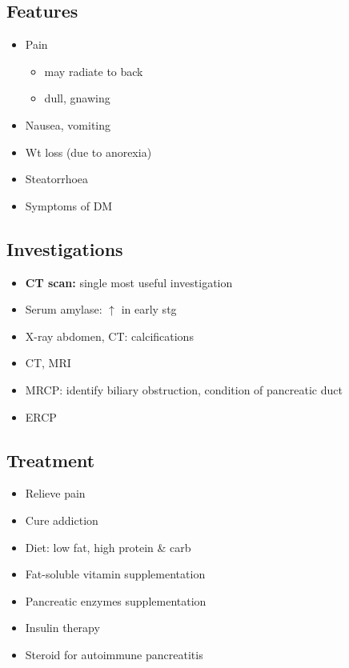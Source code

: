 \documentclass[
  12pt,
]{memoir}
\providecommand{\tightlist}{%
  \setlength{\itemsep}{0pt}\setlength{\parskip}{0pt}}
\begin{document}
\hypertarget{features-11}{%
\subsection{Features}\label{features-11}}

\begin{itemize}
\tightlist
\item
  Pain

  \begin{itemize}
  \tightlist
  \item
    may radiate to back
  \item
    dull, gnawing
  \end{itemize}
\item
  Nausea, vomiting
\item
  Wt loss (due to anorexia)
\item
  Steatorrhoea
\item
  Symptoms of DM
\end{itemize}

\hypertarget{investigations-10}{%
\subsection{Investigations}\label{investigations-10}}

\begin{itemize}
\tightlist
\item
  \textbf{CT scan:} single most useful investigation
\item
  Serum amylase: \(\uparrow\) in early stg
\item
  X-ray abdomen, CT: calcifications
\item
  CT, MRI
\item
  MRCP: identify biliary obstruction, condition of pancreatic duct
\item
  ERCP
\end{itemize}

\hypertarget{treatment-10}{%
\subsection{Treatment}\label{treatment-10}}

\begin{itemize}
\tightlist
\item
  Relieve pain
\item
  Cure addiction
\item
  Diet: low fat, high protein \& carb
\item
  Fat-soluble vitamin supplementation
\item
  Pancreatic enzymes supplementation
\item
  Insulin therapy
\item
  Steroid for autoimmune pancreatitis
\end{itemize}
\end{document}

